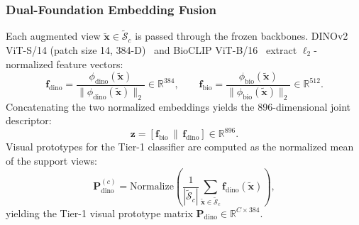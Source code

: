 \subsubsection{Dual-Foundation Embedding Fusion}
Each augmented view $\tilde{\mathbf{x}} \in \tilde{\mathcal{S}}_c$ is passed through the frozen backbones. DINOv2 ViT-S/14 (patch size 14, 384-D)~\cite{oquab2023dinov2} and BioCLIP ViT-B/16~\cite{stevens2024bioclip} extract $\ell_2$-normalized feature vectors:
\begin{equation}
    \mathbf{f}_{\text{dino}} = \frac{\phi_{\text{dino}}(\tilde{\mathbf{x}})}{\|\phi_{\text{dino}}(\tilde{\mathbf{x}})\|_2} \in \mathbb{R}^{384}, \qquad
    \mathbf{f}_{\text{bio}} = \frac{\phi_{\text{bio}}(\tilde{\mathbf{x}})}{\|\phi_{\text{bio}}(\tilde{\mathbf{x}})\|_2} \in \mathbb{R}^{512}.
\end{equation}
Concatenating the two normalized embeddings yields the 896-dimensional joint descriptor:
\begin{equation}
    \mathbf{z} = [\mathbf{f}_{\text{bio}} \,\|\, \mathbf{f}_{\text{dino}}] \in \mathbb{R}^{896}.
\end{equation}
Visual prototypes for the Tier-1 classifier are computed as the normalized mean of the support views:
\begin{equation}
    \mathbf{P}_{\text{dino}}^{(c)} = \text{Normalize}\left(\frac{1}{|\tilde{\mathcal{S}}_c|}\sum_{\tilde{\mathbf{x}} \in \tilde{\mathcal{S}}_c} \mathbf{f}_{\text{dino}}(\tilde{\mathbf{x}})\right),
\end{equation}
yielding the Tier-1 visual prototype matrix $\mathbf{P}_{\text{dino}} \in \mathbb{R}^{C \times 384}$.

